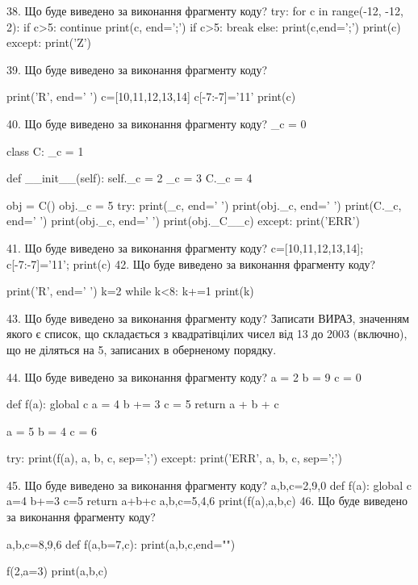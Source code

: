 \documentclass[11pt]{article}
\begin{document}
38. Що буде виведено за виконання фрагменту коду?
try:
    for c in range(-12, -12, 2):
        if c>5:
            continue
        print(c, end=';')
        if c>5:
            break
    else:
        print(c,end=';')
    print(c)
except:
    print('Z')

39. Що буде виведено за виконання фрагменту коду?

print('R', end=' ')
c=[10,11,12,13,14]
c[-7:-7]='11'
print(c)


40. Що буде виведено за виконання фрагменту коду?
_c = 0

class C:
    _c = 1
    
    def __init__(self):
        self._c = 2
        _c = 3
        C._c = 4

obj = C()
obj._c = 5
try:
    print(_c, end=' ')
    print(obj._c, end=' ')
    print(C._c, end=' ')
    print(obj._c, end=' ')
    print(obj._C__c)
except:
    print('ERR')

41. Що буде виведено за виконання фрагменту коду?
c=[10,11,12,13,14]; c[-7:-7]='11'; print(c)
42. Що буде виведено за виконання фрагменту коду?

print('R', end=' ')
k=2
while k<8:
    k+=1
print(k)


43. Що буде виведено за виконання фрагменту коду?
Записати ВИРАЗ, значенням якого є список, що складається з квадратівцілих чисел від 13 до 2003 (включно), що не діляться на 5, записаних в обернено\-му порядку.

44. Що буде виведено за виконання фрагменту коду?
a = 2
b = 9
c = 0

def f(a):
global c    a = 4
    b += 3
    c = 5
    return a + b + c

a = 5
b = 4
c = 6

try:
    print(f(a), a, b, c, sep=';')
except:
    print('ERR', a, b, c, sep=';')

45. Що буде виведено за виконання фрагменту коду?
a,b,c=2,9,0
   def f(a):
     global c     a=4
     b+=3
     c=5
     return a+b+c
   a,b,c=5,4,6
   print(f(a),a,b,c)
46. Що буде виведено за виконання фрагменту коду?

a,b,c=8,9,6
def f(a,b=7,c):
    print(a,b,c,end="")

f(2,a=3)
print(a,b,c)

\end{document}
